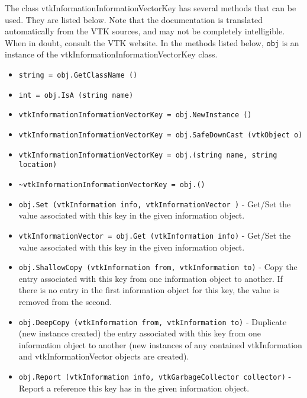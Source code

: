 The class vtkInformationInformationVectorKey has several methods that can be used.
  They are listed below.
Note that the documentation is translated automatically from the VTK sources,
and may not be completely intelligible.  When in doubt, consult the VTK website.
In the methods listed below, \verb|obj| is an instance of the vtkInformationInformationVectorKey class.
\begin{itemize}
\item  \verb|string = obj.GetClassName ()|

\item  \verb|int = obj.IsA (string name)|

\item  \verb|vtkInformationInformationVectorKey = obj.NewInstance ()|

\item  \verb|vtkInformationInformationVectorKey = obj.SafeDownCast (vtkObject o)|

\item  \verb|vtkInformationInformationVectorKey = obj.(string name, string location)|

\item  \verb|~vtkInformationInformationVectorKey = obj.()|

\item  \verb|obj.Set (vtkInformation info, vtkInformationVector )| -  Get/Set the value associated with this key in the given
 information object.

\item  \verb|vtkInformationVector = obj.Get (vtkInformation info)| -  Get/Set the value associated with this key in the given
 information object.

\item  \verb|obj.ShallowCopy (vtkInformation from, vtkInformation to)| -  Copy the entry associated with this key from one information
 object to another.  If there is no entry in the first information
 object for this key, the value is removed from the second.

\item  \verb|obj.DeepCopy (vtkInformation from, vtkInformation to)| -  Duplicate (new instance created) the entry associated with this key from
 one information object to another (new instances of any contained
 vtkInformation and vtkInformationVector objects are created).  

\item  \verb|obj.Report (vtkInformation info, vtkGarbageCollector collector)| -  Report a reference this key has in the given information object.

\end{itemize}
